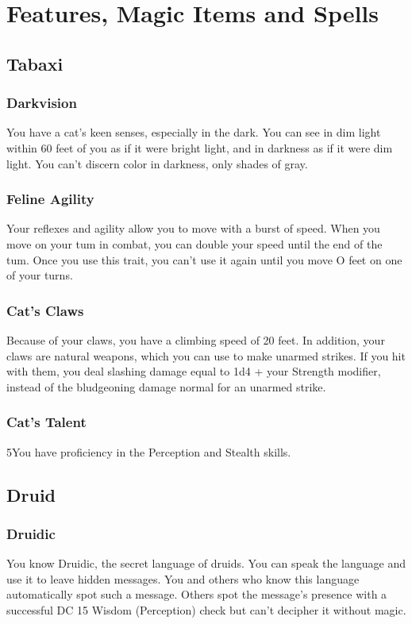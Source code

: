 \documentclass[a4paper,openany,twocolumn]{book}
\begin{document}


\chapter*{Features, Magic Items and Spells}

\section*{Tabaxi}
\subsection{Darkvision}
You have a cat's keen senses, especially in the dark. You can see in dim light
within 60 feet of you as if it were bright light, and in darkness as if it were
dim light. You can't discern color in darkness, only shades of gray.
\subsection{Feline Agility}
Your reflexes and agility allow you to
move with a burst of speed. When you move on your
tum in combat, you can double your speed until the end
of the tum. Once you use this trait, you can't use it again
until you move O feet on one of your turns.
\subsection{Cat's Claws}
Because of your claws, you have a climbing speed of 20 feet. In addition, your
claws are natural weapons, which you can use to make unarmed strikes.  If you
hit with them, you deal slashing damage equal to 1d4 + your Strength modifier,
instead of the bludgeoning damage normal for an unarmed strike.
\subsection{Cat's Talent}
5You have proficiency in the Perception and Stealth skills.
\section*{Druid}
\subsection*{Druidic}
You know Druidic, the secret language of druids. You can speak the language and
use it to leave hidden messages. You and others who know this language
automatically spot such a message. Others spot the message's presence with a
successful DC 15 Wisdom (Perception) check but can't decipher it without magic.
\end{document}
